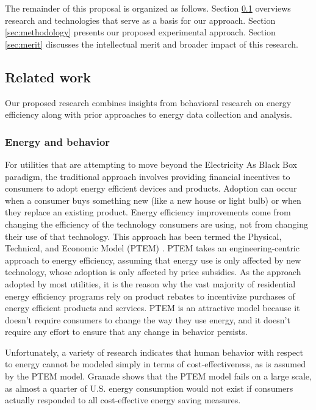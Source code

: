 The remainder of this proposal is organized as follows.  Section
\ref{sec:related-work} overviews research and technologies that serve as a
basis for our approach.  Section \ref{sec:methodology} presents our proposed
experimental approach.  Section \ref{sec:merit} discusses the intellectual
merit and broader impact of this research. 

\subsection{Related work}
\label{sec:related-work}

Our proposed research combines insights from behavioral research on energy
efficiency along with prior approaches to energy data collection and analysis.

\subsubsection{Energy and behavior}

For utilities that are attempting to move beyond the Electricity As Black
Box paradigm, the traditional approach involves providing financial
incentives to consumers to adopt energy efficient devices and products.
Adoption can occur when a consumer buys something new (like a new house or
light bulb) or when they replace an existing product.  Energy efficiency
improvements come from changing the efficiency of the technology consumers
are using, not from changing their use of that technology.  This approach
has been termed the Physical, Technical, and Economic Model (PTEM)
\cite{Lutzenhiser93}.  PTEM takes an engineering-centric approach to energy
efficiency, assuming that energy use is only affected by new technology,
whose adoption is only affected by price subsidies. As the approach adopted
by most utilities, it is the reason why the vast majority of residential
energy efficiency programs rely on product rebates to incentivize purchases
of energy efficient products and services. PTEM is an attractive model
because it doesn't require consumers to change the way they use energy, and
it doesn't require any effort to ensure that any change in behavior
persists.

Unfortunately, a variety of research indicates that human behavior with
respect to energy cannot be modeled simply in terms of cost-effectiveness,
as is assumed by the PTEM model.  Granade \cite{Granade09} shows that the
PTEM model fails on a large scale, as almost a quarter of U.S. energy
consumption would not exist if consumers actually responded to all
cost-effective energy saving measures.

